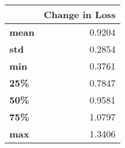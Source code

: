 \begin{tabular}{lr}
\toprule
{} &  Change in Loss \\
\midrule
\textbf{mean} &          0.9204 \\
\textbf{std } &          0.2854 \\
\textbf{min } &          0.3761 \\
\textbf{25\% } &          0.7847 \\
\textbf{50\% } &          0.9581 \\
\textbf{75\% } &          1.0797 \\
\textbf{max } &          1.3406 \\
\bottomrule
\end{tabular}
